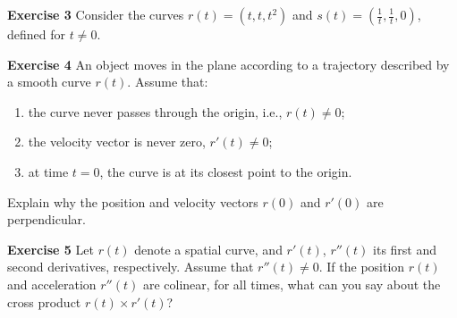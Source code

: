\documentclass[12pt,oneside]{exam}
\newenvironment{exercise}[1]{\vspace{.1in}\noindent\textbf{Exercise #1 \hspace{.05em}}}{}
\begin{document}
\begin{exercise}{3}
Consider the curves $r(t)=(t,t,t^2)$ and $s(t)=\left(\frac{1}{t},\frac{1}{t},0\right)$, defined for $t \neq 0$. 
\end{exercise}

\begin{exercise}{4}
An object moves in the plane according to a trajectory described by a smooth curve $r(t)$. Assume that:
\begin{enumerate}
\item the curve never passes through the origin, i.e., $r(t) \neq 0$; 
\item the velocity vector is never zero, $r'(t) \neq 0$;
\item  at time $t=0$, the curve is at its closest point to the origin.
\end{enumerate}

Explain why the position and velocity vectors $r(0)$ and $r'(0)$ are perpendicular. 
\end{exercise}

\begin{exercise}{5}
Let $r(t)$ denote a spatial curve, and $r'(t)$, $r''(t)$ its first and second derivatives, respectively. Assume that $r''(t) \neq 0$. If the position $r(t)$ and acceleration $r''(t)$ are colinear, for all times, what can you say about the cross product $r(t) \times r'(t)$? 
\end{exercise}
\end{document}
